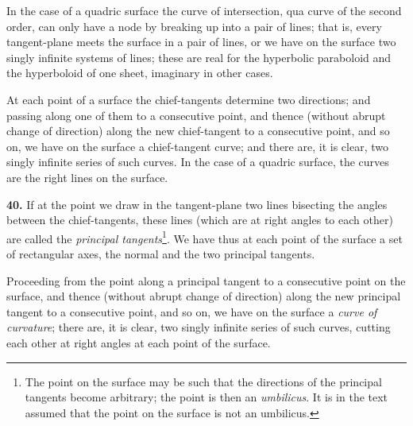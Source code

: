 \documentclass[11pt,a4paper]{book}
\begin{document}
In the case of a quadric surface the curve of intersection, qua curve of the second order, can only have a node by breaking up into a pair of lines; that is, every tangent-plane meets the surface in a pair of lines, or we have on the surface two singly infinite systems of lines; these are real for the hyperbolic paraboloid and the hyperboloid of one sheet, imaginary in other cases.

At each point of a surface the chief-tangents determine two directions; and passing along one of them to a consecutive point, and thence (without abrupt change of direction) along the new chief-tangent to a consecutive point, and so on, we have on the surface a chief-tangent curve; and there are, it is clear, two singly infinite series of such curves. In the case of a quadric surface, the curves are the right lines on the surface.

\textbf{40.} If at the point we draw in the tangent-plane two lines bisecting the angles between the chief-tangents, these lines (which are at right angles to each other) are called the \textit{principal tangents}\footnote{The point on the surface may be such that the directions of the principal tangents become arbitrary; the point is then an \textit{umbilicus}. It is in the text assumed that the point on the surface is not an umbilicus.}. We have thus at each point of the surface a set of rectangular axes, the normal and the two principal tangents.

Proceeding from the point along a principal tangent to a consecutive point on the surface, and thence (without abrupt change of direction) along the new principal tangent to a consecutive point, and so on, we have on the surface a \textit{curve of curvature}; there are, it is clear, two singly infinite series of such curves, cutting each other at right angles at each point of the surface.
\end{document}
